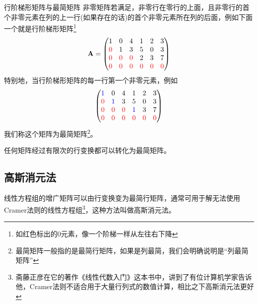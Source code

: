 \begin{definition}{行阶梯形矩阵与最简矩阵}
	非零矩阵若满足，非零行在零行的上面，且非零行的首个非零元素在列的上一行(如果存在的话)的首个非零元素所在列的后面，例如下面一个就是行阶梯形矩阵\footnote{如红色标出的0元素，像一个阶梯一样从左往右下降}$$\mathbf{A}=\begin{pmatrix}
		1 & 0 & 4 & 1 & 2 & 3\\
		\textcolor{red}{0} & 1 & 3 & 5 & 0 & 3\\
		\textcolor{red}{0} & \textcolor{red}{0} & \textcolor{red}{0} & 2 & 3 & 7\\
		\textcolor{red}{0} & \textcolor{red}{0} & \textcolor{red}{0} & \textcolor{red}{0} & \textcolor{red}{0} & \textcolor{red}{0}
	\end{pmatrix}$$
	特别地，当行阶梯形矩阵的每一行第一个非零元素，例如$$\begin{pmatrix}
		\textcolor{blue}{1} & 0 & 4 & 1 & 2 & 3\\
		\textcolor{red}{0} & \textcolor{blue}{1} & 3 & 5 & 0 & 3\\
		\textcolor{red}{0} & \textcolor{red}{0} & \textcolor{red}{0} & \textcolor{blue}{1} & 3 & 7\\
		\textcolor{red}{0} & \textcolor{red}{0} & \textcolor{red}{0} & \textcolor{red}{0} & \textcolor{red}{0} & \textcolor{red}{0}
	\end{pmatrix}$$我们称这个矩阵为最简矩阵\footnote{最简矩阵一般指的是最简行矩阵，如果是列最简，我们会明确说明是``列最简矩阵''}。
\end{definition}

\begin{corollary}
	任何矩阵经过有限次的行变换都可以转化为最简矩阵。
\end{corollary}

\subsection{高斯消元法}

线性方程组的增广矩阵可以由行变换变为最简行矩阵，通常可用于解无法使用Cramer法则的线性方程组\footnote{斋藤正彦在它的著作《线性代数入门》这本书中，讲到了有位计算机学家告诉他，Cramer法则不适合用于大量行列式的数值计算，相比之下高斯消元法更好}，这种方法叫做高斯消元法。

